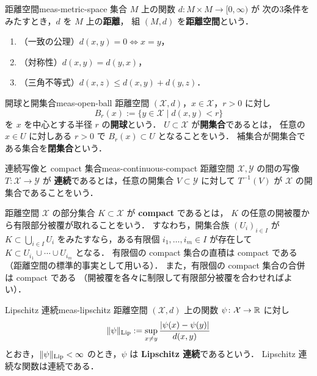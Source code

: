 \begin{definition}{距離空間}{meas-metric-space}
  集合 $M$ 上の関数 $d\colon M\times M\to[0,\infty)$ が
  次の3条件をみたすとき，$d$ を $M$ 上の\textbf{距離}，
  組 $(M,d)$ を\textbf{距離空間}という．
  \begin{enumerate}
    \item （一致の公理）$d(x,y)=0\iff x=y$，
    \item （対称性）$d(x,y)=d(y,x)$，
    \item （三角不等式）$d(x,z)\leq d(x,y)+d(y,z)$．
  \end{enumerate}
\end{definition}

\begin{definition}{開球と開集合}{meas-open-ball}
  距離空間 $(\mathcal{X},d)$，$x\in \mathcal{X}$，$r>0$ に対し
  \[
    B_r(x):=\{y\in \mathcal{X}\mid d(x,y)<r\}
  \]
  を $x$ を中心とする半径 $r$ の\textbf{開球}という．
  $U\subset \mathcal{X}$ が\textbf{開集合}であるとは，
  任意の $x\in U$ に対しある $r>0$ で $B_r(x)\subset U$
  となることをいう．
  補集合が開集合である集合を\textbf{閉集合}という．
\end{definition}

\begin{definition}{連続写像と compact 集合}{meas-continuous-compact}
  距離空間 $\mathcal{X},\mathcal{Y}$ の間の写像 $T\colon \mathcal{X}\to \mathcal{Y}$ が
  \textbf{連続}であるとは，任意の開集合 $V\subset \mathcal{Y}$ に対して
  $T^{-1}(V)$ が $\mathcal{X}$ の開集合であることをいう．

  距離空間 $\mathcal{X}$ の部分集合 $K\subset \mathcal{X}$ が \textbf{compact} であるとは，
  $K$ の任意の開被覆から有限部分被覆が取れることをいう．
  すなわち，開集合族 $(U_i)_{i\in I}$ が
  $K\subset\bigcup_{i\in I}U_i$ をみたすなら，ある有限個
  $i_1,\dots,i_m\in I$ が存在して
  $K\subset U_{i_1}\cup\cdots\cup U_{i_m}$ となる．
  有限個の compact 集合の直積は compact である
  （距離空間の標準的事実として用いる）．
  また，有限個の compact 集合の合併は compact である
  （開被覆を各々に制限して有限部分被覆を合わせればよい）．
\end{definition}

\begin{definition}{Lipschitz 連続}{meas-lipschitz}
  距離空間 $(\mathcal{X},d)$ 上の関数 $\psi\colon\mathcal{X}\to\mathbb{R}$ に対し
  \[
    \lVert \psi \rVert_{\operatorname{Lip}}
    :=\sup_{x\neq y}\frac{\lvert \psi(x)-\psi(y) \rvert}{d(x,y)}
  \]
  とおき，$\lVert \psi \rVert_{\operatorname{Lip}}<\infty$ のとき，$\psi$ は
  \textbf{Lipschitz 連続}であるという．
  Lipschitz 連続な関数は連続である．
\end{definition}

